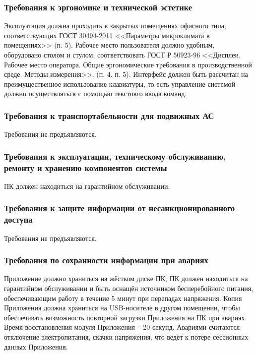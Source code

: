 \documentclass[12pt,a4paper]{article}
\begin{document}
\subsubsection{Требования к эргономике и технической эстетике} \label{ergo}
\noindent Эксплуатация должна проходить в закрытых помещениях офисного типа, соответствующих ГОСТ 30494-2011
<<Параметры микроклимата в помещениях>> (п. 5). \medskip \newline
Рабочее место пользователя должно удобным, оборудовано столом и стулом, соответствовать ГОСТ Р 50923-96
<<Дисплеи. Рабочее место оператора. Общие эргономические требования в производственной среде. Методы измерения>>.
(п. 4, п. 5). \medskip \newline
Интерфейс должен быть рассчитан на преимущественное использование клавиатуры, то есть управление системой должно осуществляться с помощью текстовго ввода команд. 

\subsubsection{Требования к транспортабельности для подвижных АС}
Требования не предъявляются.

\subsubsection{Требования к эксплуатации, техническому обслуживанию, ремонту и хранению компонентов системы}
ПК должен находиться на гарантийном обслуживании.

\subsubsection{Требования к защите информации от несанкционированного доступа}
Требования не предъявляются.

\subsubsection{Требования по сохранности информации при авариях}\label{trouble}
Приложение должно храниться на жёстком диске ПК, ПК должен находиться на гарантийном обслуживании и быть
оснащён источником бесперебойного питания, обеспечивающим работу в течение 5 минут при перепадах напряжения. \medskip \newline
Копия Приложения должна храниться на USB-носителе в другом помещении, чтобы обеспечивать возможность повторной загрузки Приложения 
на ПК при авариях. Время восстановления модуля Приложения -- 20 секунд. \medskip \newline
Авариями считаются отключение электропитания, скачки напряжения, что ведёт к потере сессионных данных Приложения.
\end{document}
